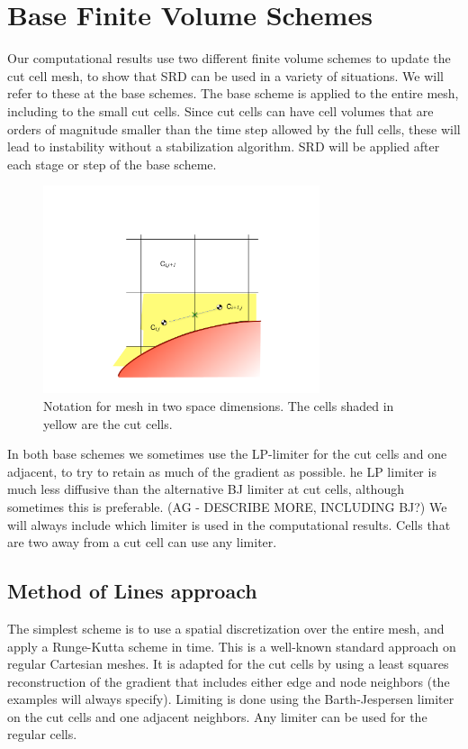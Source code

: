 \section{Base Finite Volume Schemes}\label{sec:basefv}

Our computational results use two different finite volume schemes
to update the cut cell mesh, to show that SRD can be used in a
variety of situations.
We will refer to these at the base schemes. 
The  base scheme is applied to the entire mesh, including  
to the small cut cells.  Since cut cells can have cell volumes that are
orders of magnitude smaller than the time step allowed by the full
cells, these will lead to instability without a stabilization algorithm.
SRD will be applied after each stage or step of the base scheme.

\begin{figure}
\begin{center}
\includegraphics[width=3.2in]{figs/2dfig.pdf}
\caption{\sf Notation for mesh in two space dimensions. The cells shaded
in yellow are the cut cells.} 
\label{fig:2dfig}
\end{center}
\end{figure}

In both base schemes we sometimes use the LP-limiter \cite{May_Berger_LP} for the cut 
cells and one adjacent, to try to retain as much of the gradient as possible. 
 he LP limiter is much less diffusive than the alternative BJ limiter at cut cells,
although sometimes this is preferable. (AG - DESCRIBE MORE, INCLUDING BJ?)  We will always include which limiter is used
in the computational results.  Cells that are two away from a cut cell
can use any limiter. 

\subsection{Method of Lines approach}
The simplest scheme is to use a spatial discretization over the entire
mesh, and apply a Runge-Kutta scheme in time. This is a well-known
standard approach
on regular Cartesian meshes. It is adapted for the cut cells by
using a least squares reconstruction of the gradient that includes
either edge and node neighbors (the examples will always specify).
Limiting is done using the Barth-Jespersen limiter \cite{} 
on the cut cells and one adjacent neighbors. Any limiter
can be used for the regular cells.

